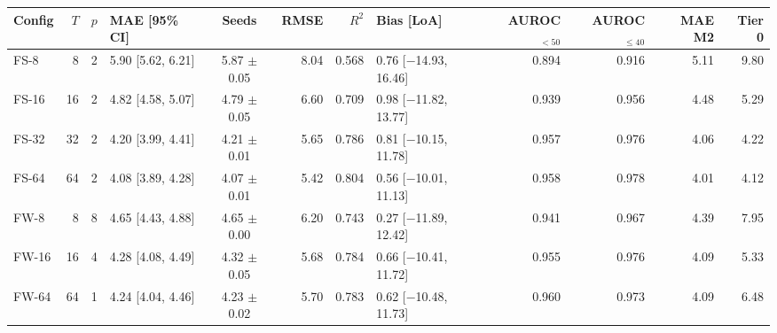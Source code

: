 \begin{tabular}{lrrlcrrlrrrr}
\toprule
Config & $T$ & $p$ & MAE [95\% CI] & Seeds & RMSE & $R^2$ & Bias [LoA] & AUROC$_{<50}$ & AUROC$_{\le 40}$ & MAE M2 & Tier 0 \\
\midrule
FS-8 & 8 & 2 & 5.90 [5.62, 6.21] & 5.87 $\pm$ 0.05 & 8.04 & 0.568 & 0.76 [$-$14.93, 16.46] & 0.894 & 0.916 & 5.11 & 9.80 \\
FS-16 & 16 & 2 & 4.82 [4.58, 5.07] & 4.79 $\pm$ 0.05 & 6.60 & 0.709 & 0.98 [$-$11.82, 13.77] & 0.939 & 0.956 & 4.48 & 5.29 \\
FS-32 & 32 & 2 & 4.20 [3.99, 4.41] & 4.21 $\pm$ 0.01 & 5.65 & 0.786 & 0.81 [$-$10.15, 11.78] & 0.957 & 0.976 & 4.06 & 4.22 \\
FS-64 & 64 & 2 & 4.08 [3.89, 4.28] & 4.07 $\pm$ 0.01 & 5.42 & 0.804 & 0.56 [$-$10.01, 11.13] & 0.958 & 0.978 & 4.01 & 4.12 \\
FW-8 & 8 & 8 & 4.65 [4.43, 4.88] & 4.65 $\pm$ 0.00 & 6.20 & 0.743 & 0.27 [$-$11.89, 12.42] & 0.941 & 0.967 & 4.39 & 7.95 \\
FW-16 & 16 & 4 & 4.28 [4.08, 4.49] & 4.32 $\pm$ 0.05 & 5.68 & 0.784 & 0.66 [$-$10.41, 11.72] & 0.955 & 0.976 & 4.09 & 5.33 \\
FW-64 & 64 & 1 & 4.24 [4.04, 4.46] & 4.23 $\pm$ 0.02 & 5.70 & 0.783 & 0.62 [$-$10.48, 11.73] & 0.960 & 0.973 & 4.09 & 6.48 \\
\bottomrule
\end{tabular}
